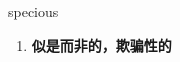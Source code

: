 
\begin{frame}
{\huge specious}
\begin{center}
\begin{enumerate}\Large
  \item \textbf{似是而非的，欺骗性的}
\end{enumerate}
\end{center}
\end{frame}
